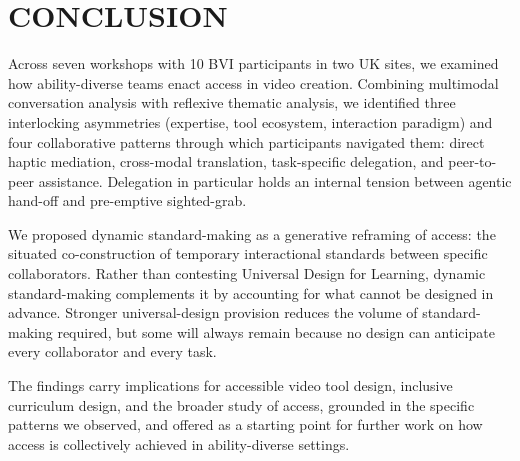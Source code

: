 \section{CONCLUSION}
Across seven workshops with 10 BVI participants in two UK sites, we examined how ability-diverse teams enact access in video creation. Combining multimodal conversation analysis with reflexive thematic analysis, we identified three interlocking asymmetries (expertise, tool ecosystem, interaction paradigm) and four collaborative patterns through which participants navigated them: direct haptic mediation, cross-modal translation, task-specific delegation, and peer-to-peer assistance. Delegation in particular holds an internal tension between agentic hand-off and pre-emptive sighted-grab.

We proposed dynamic standard-making as a generative reframing of access: the situated co-construction of temporary interactional standards between specific collaborators. Rather than contesting Universal Design for Learning, dynamic standard-making complements it by accounting for what cannot be designed in advance. Stronger universal-design provision reduces the volume of standard-making required, but some will always remain because no design can anticipate every collaborator and every task.

The findings carry implications for accessible video tool design, inclusive curriculum design, and the broader study of access, grounded in the specific patterns we observed, and offered as a starting point for further work on how access is collectively achieved in ability-diverse settings.
